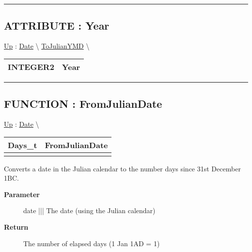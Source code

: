 \par


\rule{\linewidth}{0.5pt}
\subsection*{ATTRIBUTE : Year}
\hypertarget{ecldoc:date.tojulianymd.result.year}{}
\hyperlink{ecldoc:date.tojulianymd}{Up} :
\hspace{0pt} \hyperlink{ecldoc:Date}{Date} \textbackslash 
\hspace{0pt} \hyperlink{ecldoc:date.tojulianymd}{ToJulianYMD} \textbackslash 

{\renewcommand{\arraystretch}{1.5}
\begin{tabularx}{\textwidth}{|>{\raggedright\arraybackslash}l|X|}
\hline
\hspace{0pt}INTEGER2 & Year \\
\hline
\end{tabularx}
}

\par


\rule{\linewidth}{0.5pt}


\subsection*{FUNCTION : FromJulianDate}
\hypertarget{ecldoc:date.fromjuliandate}{}
\hyperlink{ecldoc:Date}{Up} :
\hspace{0pt} \hyperlink{ecldoc:Date}{Date} \textbackslash 

{\renewcommand{\arraystretch}{1.5}
\begin{tabularx}{\textwidth}{|>{\raggedright\arraybackslash}l|X|}
\hline
\hspace{0pt}Days\_t & FromJulianDate \\
\hline
\multicolumn{2}{|>{\raggedright\arraybackslash}X|}{\hspace{0pt}(Date\_t date)} \\
\hline
\end{tabularx}
}

\par
Converts a date in the Julian calendar to the number days since 31st December 1BC.

\par
\begin{description}
\item [\textbf{Parameter}] date ||| The date (using the Julian calendar)
\item [\textbf{Return}] The number of elapsed days (1 Jan 1AD = 1)
\end{description}

